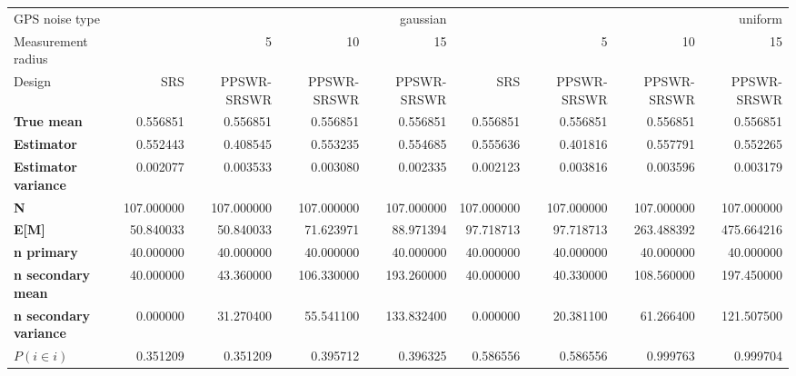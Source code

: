 \begin{tabular}{lrrrrrrrr}
\toprule
GPS noise type & \multicolumn{4}{r}{gaussian} & \multicolumn{4}{r}{uniform} \\
Measurement radius & \multicolumn{2}{r}{5} & 10 & 15 & \multicolumn{2}{r}{5} & 10 & 15 \\
Design & SRS & PPSWR-SRSWR & PPSWR-SRSWR & PPSWR-SRSWR & SRS & PPSWR-SRSWR & PPSWR-SRSWR & PPSWR-SRSWR \\
\midrule
\textbf{True mean} & 0.556851 & 0.556851 & 0.556851 & 0.556851 & 0.556851 & 0.556851 & 0.556851 & 0.556851 \\
\textbf{Estimator} & 0.552443 & 0.408545 & 0.553235 & 0.554685 & 0.555636 & 0.401816 & 0.557791 & 0.552265 \\
\textbf{Estimator variance} & 0.002077 & 0.003533 & 0.003080 & 0.002335 & 0.002123 & 0.003816 & 0.003596 & 0.003179 \\
\textbf{N} & 107.000000 & 107.000000 & 107.000000 & 107.000000 & 107.000000 & 107.000000 & 107.000000 & 107.000000 \\
\textbf{E[M]} & 50.840033 & 50.840033 & 71.623971 & 88.971394 & 97.718713 & 97.718713 & 263.488392 & 475.664216 \\
\textbf{n primary} & 40.000000 & 40.000000 & 40.000000 & 40.000000 & 40.000000 & 40.000000 & 40.000000 & 40.000000 \\
\textbf{n secondary mean} & 40.000000 & 43.360000 & 106.330000 & 193.260000 & 40.000000 & 40.330000 & 108.560000 & 197.450000 \\
\textbf{n secondary variance} & 0.000000 & 31.270400 & 55.541100 & 133.832400 & 0.000000 & 20.381100 & 61.266400 & 121.507500 \\
\textbf{$P(i \in i)$} & 0.351209 & 0.351209 & 0.395712 & 0.396325 & 0.586556 & 0.586556 & 0.999763 & 0.999704 \\
\bottomrule
\end{tabular}
